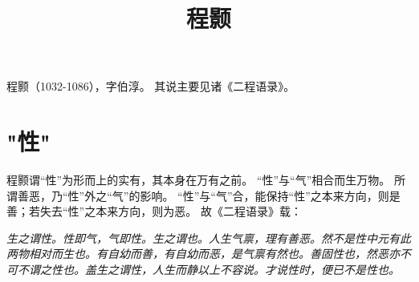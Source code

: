 \documentclass[11pt]{article}
\title{程颢}
\author{}
\date{}
\begin{document}
\begin{sloppypar}
  \maketitle

  \linenumbers
程颢（1032-1086），字伯淳。
其说主要见诸《二程语录》。

\section{"性"}
程颢谓“性”为形而上的实有，其本身在万有之前。
“性”与“气”相合而生万物。
所谓善恶，乃“性”外之“气”的影响。
“性”与“气”合，能保持“性”之本来方向，则是善；若失去“性”之本来方向，则为恶。
故《二程语录》载：

\textit{生之谓性。性即气，气即性。生之谓也。人生气禀，理有善恶。然不是性中元有此两物相对而生也。有自幼而善，有自幼而恶，是气禀有然也。善固性也，然恶亦不可不谓之性也。盖生之谓性，人生而静以上不容说。才说性时，便已不是性也。}



  
\end{sloppypar}
\end{document}
